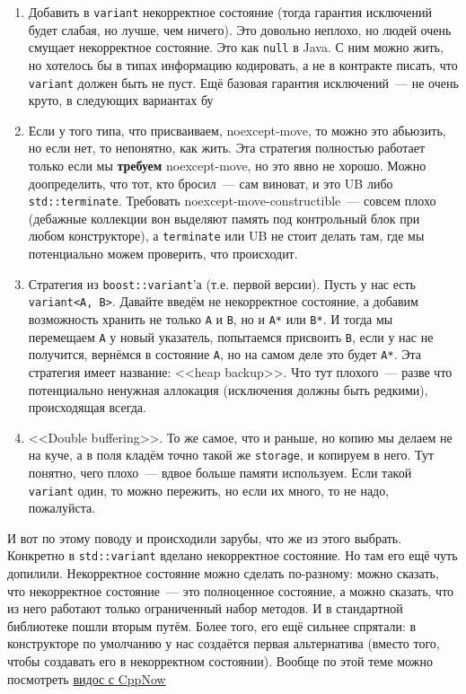 \documentclass{article}
\begin{document}
    \begin{enumerate}
        \item Добавить в \texttt{variant} некорректное состояние (тогда гарантия исключений будет слабая, но лучше, чем ничего). Это довольно неплохо, но людей очень смущает некорректное состояние. Это как \texttt{null} в Java. С ним можно жить, но хотелось бы в типах информацию кодировать, а не в контракте писать, что \texttt{variant} должен быть не пуст. Ещё базовая гарантия исключений~--- не очень круто, в следующих вариантах бу
        \item Если у того типа, что присваиваем, noexcept-move, то можно это абьюзить, но если нет, то непонятно, как жить. Эта стратегия полностью работает только если мы \textbf{требуем} noexcept-move, но это явно не хорошо. Можно доопределить, что тот, кто бросил~--- сам виноват, и это UB либо \texttt{std::terminate}. Требовать noexcept-move-constructible~--- совсем плохо (дебажные коллекции вон выделяют память под контрольный блок при любом конструкторе), а \texttt{terminate} или UB не стоит делать там, где мы потенциально можем проверить, что происходит.
        \item Стратегия из \texttt{boost::variant}'а (т.е. первой версии). Пусть у нас есть \texttt{variant<A, B>}. Давайте введём не некорректное состояние, а добавим возможность хранить не только \texttt{A} и \texttt{B}, но и \texttt{A*} или \texttt{B*}. И тогда мы перемещаем \texttt{A} у новый указатель, попытаемся присвоить \texttt{B}, если у нас не получится, вернёмся в состояние \texttt{A}, но на самом деле это будет \texttt{A*}. Эта стратегия имеет название: <<heap backup>>. Что тут плохого~--- разве что потенциально ненужная аллокация (исключения должны быть редкими), происходящая всегда.
        \item <<Double buffering>>. То же самое, что и раньше, но копию мы делаем не на куче, а в поля кладём точно такой же \texttt{storage}, и копируем в него. Тут понятно, чего плохо~--- вдвое больше памяти используем. Если такой \texttt{variant} один, то можно пережить, но если их много, то не надо, пожалуйста.
    \end{enumerate}
    И вот по этому поводу и происходили зарубы, что же из этого выбрать. Конкретно в \texttt{std::variant} вделано некорректное состояние. Но там его ещё чуть допилили. Некорректное состояние можно сделать по-разному: можно сказать, что некорректное состояние~--- это полноценное состояние, а можно сказать, что из него работают только ограниченный набор методов. И в стандартной библиотеке пошли вторым путём. Более того, его ещё сильнее спрятали: в конструкторе по умолчанию у нас создаётся первая альтернатива (вместо того, чтобы создавать его в некорректном состоянии). Вообще по этой теме можно посмотреть \href{https://www.youtube.com/watch?v=JUxhwf7gYLg}{видос с CppNow}\\
\end{document}
